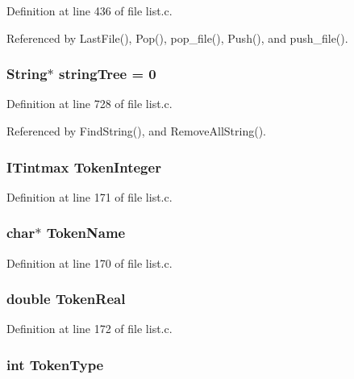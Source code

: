 Definition at line 436 of file list.c.

Referenced by Last\-File(), Pop(), pop\_\-file(), Push(), and push\_\-file().
\subsubsection{\setlength{\rightskip}{0pt plus 5cm}\bf{String}$\ast$ \bf{string\-Tree} = 0\hspace{0.3cm}{\tt  [static]}}\label{list_8c_4880fa06008b6d08b85db8c8eadd082a}




Definition at line 728 of file list.c.

Referenced by Find\-String(), and Remove\-All\-String().
\subsubsection{\setlength{\rightskip}{0pt plus 5cm}\bf{ITintmax} \bf{Token\-Integer}}\label{list_8c_a05a98db4e5f1adf600353b409c73337}




Definition at line 171 of file list.c.
\subsubsection{\setlength{\rightskip}{0pt plus 5cm}char$\ast$ \bf{Token\-Name}}\label{list_8c_285ec8e248204d1c7093e162ff8a9cf3}




Definition at line 170 of file list.c.
\subsubsection{\setlength{\rightskip}{0pt plus 5cm}double \bf{Token\-Real}}\label{list_8c_433b5350d88710b59c923b53834edf5c}




Definition at line 172 of file list.c.
\subsubsection{\setlength{\rightskip}{0pt plus 5cm}int \bf{Token\-Type}}\label{list_8c_58872325a7ea09786c3253d71a4ea503}




